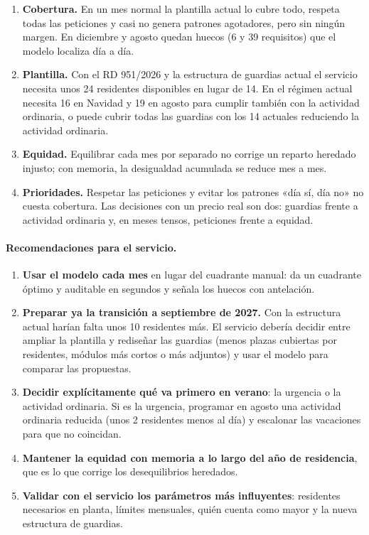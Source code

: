\begin{enumerate}[label=\textbf{P\arabic*.}]
  \item \textbf{Cobertura.} En un mes normal la plantilla actual lo cubre todo, respeta todas las peticiones y casi no genera patrones agotadores, pero sin ningún margen. En diciembre y agosto quedan huecos (6 y 39 requisitos) que el modelo localiza día a día.
  \item \textbf{Plantilla.} Con el RD 951/2026 y la estructura de guardias actual el servicio necesita unos 24 residentes disponibles en lugar de 14. En el régimen actual necesita 16 en Navidad y 19 en agosto para cumplir también con la actividad ordinaria, o puede cubrir todas las guardias con los 14 actuales reduciendo la actividad ordinaria.
  \item \textbf{Equidad.} Equilibrar cada mes por separado no corrige un reparto heredado injusto; con memoria, la desigualdad acumulada se reduce mes a mes.
  \item \textbf{Prioridades.} Respetar las peticiones y evitar los patrones «día sí, día no» no cuesta cobertura. Las decisiones con un precio real son dos: guardias frente a actividad ordinaria y, en meses tensos, peticiones frente a equidad.
\end{enumerate}

\paragraph{Recomendaciones para el servicio.}
\begin{enumerate}
  \item \textbf{Usar el modelo cada mes} en lugar del cuadrante manual: da un cuadrante óptimo y auditable en segundos y señala los huecos con antelación.
  \item \textbf{Preparar ya la transición a septiembre de 2027.} Con la estructura actual harían falta unos 10 residentes más. El servicio debería decidir entre ampliar la plantilla y rediseñar las guardias (menos plazas cubiertas por residentes, módulos más cortos o más adjuntos) y usar el modelo para comparar las propuestas.
  \item \textbf{Decidir explícitamente qué va primero en verano}: la urgencia o la actividad ordinaria. Si es la urgencia, programar en agosto una actividad ordinaria reducida (unos 2 residentes menos al día) y escalonar las vacaciones para que no coincidan.
  \item \textbf{Mantener la equidad con memoria a lo largo del año de residencia}, que es lo que corrige los desequilibrios heredados.
  \item \textbf{Validar con el servicio los parámetros más influyentes}: residentes necesarios en planta, límites mensuales, quién cuenta como mayor y la nueva estructura de guardias.
\end{enumerate}

